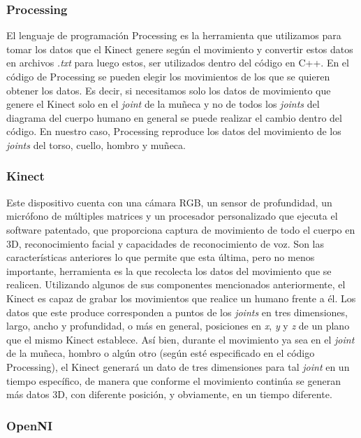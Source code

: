 \documentclass[letterpaper]{article}
\begin{document}
\subsubsection{Processing}

\quad \quad El lenguaje de programación Processing es la herramienta que utilizamos para tomar los datos que el Kinect genere según el movimiento y convertir estos datos en archivos \textit{.txt} para luego estos, ser utilizados dentro del código en C++. En el código de Processing se pueden elegir 
los movimientos de los que se quieren obtener los datos. Es decir, si necesitamos solo los datos de movimiento que genere el Kinect solo en el \textit{joint} de la muñeca y no de todos los \textit{joints} del diagrama del cuerpo humano en general se puede realizar el cambio dentro del código. En nuestro caso, 
Processing reproduce los datos del movimiento de los \textit{joints} del torso, cuello, hombro y muñeca. 

\subsubsection{Kinect}

\quad \quad Este dispositivo cuenta con una cámara RGB, un sensor de profundidad, un micrófono de múltiples matrices y un procesador personalizado que ejecuta el software patentado, que proporciona captura de movimiento de todo el cuerpo en 3D, reconocimiento facial y capacidades de reconocimiento de voz. 
Son las características anteriores lo que permite que esta última, pero no menos importante, herramienta es la que recolecta los datos del movimiento que se realicen. Utilizando algunos de sus componentes mencionados anteriormente, el Kinect es capaz de grabar los movimientos que realice un humano
frente a él. Los datos que este produce corresponden a puntos de los \textit{joints} en tres dimensiones, largo, ancho y profundidad, o más en general, posiciones en \textit{x}, \textit{y} y \textit{z} de un plano que el mismo Kinect establece. Así bien, durante el movimiento ya sea en el \textit{joint} de la muñeca, hombro o algún otro (según esté especificado en el código Processing), 
el Kinect generará un dato de tres dimensiones para tal \textit{joint} en un tiempo específico, de manera que conforme el movimiento continúa se generan más datos 3D, con diferente posición, y obviamente, en un tiempo diferente. 

\subsubsection{OpenNI}
\end{document}
